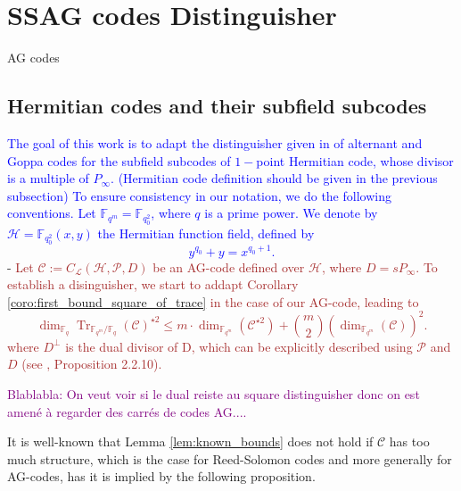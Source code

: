 \documentclass[a4paper]{article}
\newcommand{\calP}{\mathcal{P}}
\newcommand{\calH}{\mathcal{H}}
\newcommand{\calL}{\mathcal{L}}
\newcommand{\calC}{\mathcal{C}}
\newcommand{\fqm}{\mathbb{F}_{q^m}}
\newcommand{\fq}{\mathbb{F}_{q}}
\newcommand{\Tr}[1]{\operatorname{Tr}_{\mathbb{F}_{q^m}/\fq}\left(#1\right)}
\newcommand\jade[1]{\textcolor{purple}{#1}}
\newcommand\mathieu[1]{\textcolor{brown}{#1}}
\begin{document}
\section{SSAG codes Distinguisher}
AG codes

\subsection{Hermitian codes and their subfield subcodes}


\textcolor{blue}{The goal of this work is to adapt the distinguisher given in \cite{rocco} of alternant and Goppa codes for the subfield subcodes of $1-$point Hermitian code, whose divisor is a multiple of $P_{\infty}$. (Hermitian code definition should be given in the previous subsection) To ensure consistency in our notation, we do the following conventions. Let $\mathbb{F}_{q^m}=\mathbb{F}_{q_0^2}$, where $q$ is a prime power. We denote by $\calH = \mathbb{F}_{q_0^2}(x,y)$ the Hermitian function field, defined by 
	\[ y^{q_0}+y=x^{q_0+1}.\] }-
\mathieu{Let $\mathcal{C} := C_{\calL}(\calH,\mathcal{P},D)$ be an AG-code defined over $\calH$, where $D=sP_{\infty}$. To establish a disinguisher, we start to addapt Corollary \ref{coro:first_bound_square_of_trace} in the case of our AG-code, leading to 
\begin{equation} \label{eq:first_bound_ssag}
    \dim_{\fq}\Tr{\calC}^{\star2} \leq m \cdot \dim_{\fqm}(\calC^{\star 2}) + \binom{m}{2} (\dim_{\fqm}(\calC))^2.
\end{equation}
where $D^{\perp}$ is the dual divisor of D, which can be explicitly described using $\calP$ and $D$ (see \cite{sti}, Proposition 2.2.10). }


\jade{Blablabla: On veut voir si le dual reiste au square distinguisher donc on est amené à regarder des carrés de codes AG....}

It is well-known that Lemma \ref{lem:known_bounds} does not hold if $\calC$ has too much structure, which is the case for Reed-Solomon codes and more generally for AG-codes, has it is implied by the following proposition.
\end{document}
